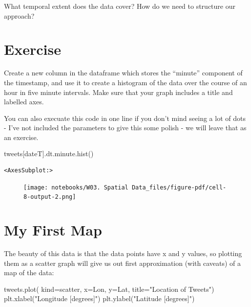 \documentclass[
  letterpaper,
  DIV=11,
  numbers=noendperiod]{scrreprt}
\newenvironment{Shaded}{\begin{snugshade}}{\end{snugshade}}
\newcommand{\NormalTok}[1]{\textcolor[rgb]{0.00,0.23,0.31}{#1}}
\newcommand{\OperatorTok}[1]{\textcolor[rgb]{0.37,0.37,0.37}{#1}}
\newcommand{\StringTok}[1]{\textcolor[rgb]{0.13,0.47,0.30}{#1}}
\begin{document}
What temporal extent does the data cover? How do we need to structure
our approach?

\hypertarget{exercise-6}{%
\section{Exercise}\label{exercise-6}}

Create a new column in the dataframe which stores the ``minute''
component of the timestamp, and use it to create a histogram of the data
over the course of an hour in five minute intervals. Make sure that your
graph includes a title and labelled axes.

You can also execuate this code in one line if you don't mind seeing a
lot of dots - I've not included the parameters to give this some polish
- we will leave that as an exercise.

\begin{Shaded}
\begin{Highlighting}[]
\NormalTok{tweets[}\StringTok{\textquotesingle{}dateT\textquotesingle{}}\NormalTok{].dt.minute.hist()}
\end{Highlighting}
\end{Shaded}

\begin{verbatim}
<AxesSubplot:>
\end{verbatim}

\begin{figure}[H]

{\centering \texttt{[image: notebooks/W03. Spatial Data\_files/figure-pdf/cell-8-output-2.png]}

}

\end{figure}

\hypertarget{my-first-map}{%
\section{My First Map}\label{my-first-map}}

The beauty of this data is that the data points have x and y values, so
plotting them as a scatter graph will give us out first approximation
(with caveats) of a map of the data:

\begin{Shaded}
\begin{Highlighting}[]
\NormalTok{tweets.plot(}
\NormalTok{    kind}\OperatorTok{=}\StringTok{\textquotesingle{}scatter\textquotesingle{}}\NormalTok{,}
\NormalTok{    x}\OperatorTok{=}\StringTok{\textquotesingle{}Lon\textquotesingle{}}\NormalTok{,}
\NormalTok{    y}\OperatorTok{=}\StringTok{\textquotesingle{}Lat\textquotesingle{}}\NormalTok{,}
\NormalTok{    title}\OperatorTok{=}\StringTok{"Location of Tweets"}\NormalTok{)}
\NormalTok{plt.xlabel(}\StringTok{"Longitude [degrees]"}\NormalTok{)}
\NormalTok{plt.ylabel(}\StringTok{"Latitude [degrees]"}\NormalTok{)}
\end{Highlighting}
\end{Shaded}
\end{document}
